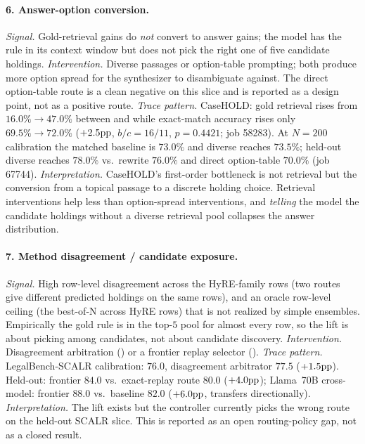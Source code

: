 \paragraph{6. Answer-option conversion.}
\emph{Signal.} Gold-retrieval gains do \emph{not} convert to answer
gains; the model has the rule in its context window but does not pick the
right one of five candidate holdings.
\emph{Intervention.} Diverse \hyre{} passages or option-table
prompting; both produce more option spread for the synthesizer to
disambiguate against. The direct option-table route is a clean negative
on this slice and is reported as a design point, not as a positive
route.
\emph{Trace pattern.} CaseHOLD: gold retrieval rises from
$16.0\%\!\rightarrow\!47.0\%$ between  and
 while exact-match accuracy rises only
$69.5\%\!\rightarrow\!72.0\%$ ($+2.5\mathrm{pp}{}$, $b/c{=}16/11$, $p{=}0.4421$;
job 58283). At $N{=}200$ calibration the matched baseline is $73.0\%$
and diverse \hyre{} reaches $73.5\%$; held-out diverse \hyre{}
reaches $78.0\%$ vs.\ rewrite $76.0\%$ and direct option-table $70.0\%$
(job 67744).
\emph{Interpretation.} CaseHOLD's first-order bottleneck is not
retrieval but the conversion from a topical passage to a discrete
holding choice. Retrieval interventions help less than option-spread
interventions, and \emph{telling} the model the candidate holdings
without a diverse retrieval pool collapses the answer distribution.

\paragraph{7. Method disagreement / candidate exposure.}
\emph{Signal.} High row-level disagreement across the HyRE-family
rows (two routes give different predicted holdings on the same rows), and
an oracle row-level ceiling (the best-of-N across HyRE rows) that is not
realized by simple ensembles. Empirically the gold rule is in the top-$5$
pool for almost every row, so the lift is about picking among candidates,
not about candidate discovery.
\emph{Intervention.} Disagreement arbitration
() or a
frontier replay selector ().
\emph{Trace pattern.} LegalBench-SCALR calibration:
 $76.0$, disagreement arbitrator $77.5$
($+1.5\mathrm{pp}{}$). Held-out: frontier $84.0$ vs.\ exact-replay route $80.0$
($+4.0\mathrm{pp}{}$); Llama~70B cross-model: frontier $88.0$ vs.\ baseline
$82.0$ ($+6.0\mathrm{pp}{}$, transfers directionally).
\emph{Interpretation.} The lift exists but the controller currently
picks the wrong route on the held-out SCALR slice. This is reported as
an open routing-policy gap, not as a closed result.

